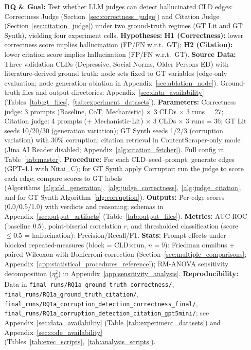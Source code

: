 \noindent\textbf{RQ \& Goal:} Test whether LLM judges can detect hallucinated CLD edges: Correctness Judge (Section~\ref{sec:correctness_judge}) and Citation Judge (Section~\ref{sec:citation_judge}) under two ground-truth regimes (GT Lit and GT Synth), yielding four experiment cells. \textbf{Hypotheses:} \textbf{H1 (Correctness):} lower correctness score implies hallucination (FP/FN w.r.t.\ GT); \textbf{H2 (Citation):} lower citation score implies hallucination (FP/FN w.r.t.\ GT). \textbf{Source Data:} Three validation CLDs (Depressive, Social Norms, Older Persons ED) with literature-derived ground truth; node sets fixed to GT variables (edge-only evaluation; node generation ablation in Appendix~\ref{sec:ablation_node}). Ground-truth files and output directories: Appendix~\ref{sec:data_availability} (Tables~\ref{tab:gt_files},~\ref{tab:experiment_datasets}). \textbf{Parameters:} Correctness judge: 3 prompts (Baseline, CoT, Mechanistic) $\times$ 3 CLDs $\times$ 3 runs = 27; Citation judge: 4 prompts (+ Mechanistic-Lit) $\times$ 3 CLDs $\times$ 3 runs = 36; GT Lit seeds 10/20/30 (generation variation); GT Synth seeds 1/2/3 (corruption variation) with 30\% corruption; citation retrieval in ContentScraper-only mode (Jina AI Reader disabled; Appendix~\ref{alg:citation_fetcher}). Full config in Table~\ref{tab:master}. \textbf{Procedure:} For each CLD--seed--prompt: generate edges (GPT-4.1 with Nitai\_C); for GT Synth apply Corruptor; run the judge to score each edge; compare scores to GT labels (Algorithms~\ref{alg:cld_generation},~\ref{alg:judge_correctness},~\ref{alg:judge_citation}, and for GT Synth Algorithm~\ref{alg:corruption}). \textbf{Outputs:} Per-edge scores (0.0/0.5/1.0) with verdicts and reasoning; schemas in Appendix~\ref{sec:output_artifacts} (Table~\ref{tab:output_files}). \textbf{Metrics:} AUC-ROC (baseline 0.5), point-biserial correlation $r$, and thresholded classification (score $\leq 0.5$ = hallucination): Precision/Recall/F1. \textbf{Stats:} Prompt effects under blocked repeated-measures (block = CLD$\times$run, $n{=}9$): Friedman omnibus + paired Wilcoxon with Bonferroni correction (Section~\ref{sec:multiple_comparisons}; Appendix~\ref{app:statistical_procedures_reference}); RM-ANOVA sensitivity decomposition ($\eta^2_p$) in Appendix~\ref{app:sensitivity_analysis}. \textbf{Reproducibility:} Data in \texttt{final\_runs/RQ1a\_ground\_truth\_correctness/}, \texttt{final\_runs/RQ1a\_ground\_truth\_citation/}, \texttt{final\_runs/RQ1a\_corruption\_detection\_correctness\_final/}, \texttt{final\_runs/RQ1a\_corruption\_detection\_citation\_gpt5mini/}; see Appendix~\ref{sec:data_availability} (Table~\ref{tab:experiment_datasets}) and Appendix~\ref{sec:code_availability} (Tables~\ref{tab:exec_scripts},~\ref{tab:analysis_scripts}).

